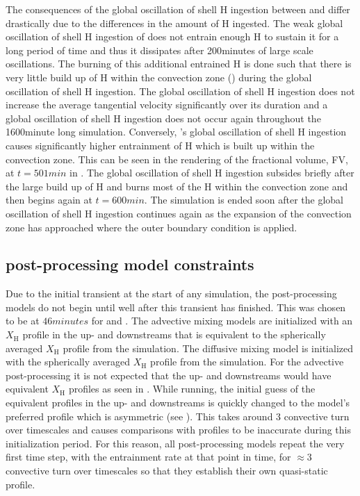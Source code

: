 \documentclass[fleqn,usenatbib]{mnras}
\newcommand{\ppmstar}{\code{PPMstar}}
\begin{document}
The consequences of the global oscillation of shell H ingestion between  and  differ
drastically due to the differences in the amount of H ingested. The weak global oscillation of shell H ingestion of
 does not entrain enough H to sustain it for a long period of time and
thus it dissipates after \unit{200}{minutes} of large scale oscillations. The
burning of this additional entrained H is done such that there is very little
build up of H within the convection zone () during the global oscillation of shell H ingestion. The
global oscillation of shell H ingestion does not increase the average tangential velocity significantly over its
duration and a global oscillation of shell H ingestion does not occur again throughout the \unit{1600}{minute} long
simulation. Conversely, 's global oscillation of shell H ingestion causes significantly higher
entrainment of H which is built up within the convection zone. This can be seen
in the rendering of the fractional volume, FV, at $t = \unit{501}{min}$ in
. The global oscillation of shell H ingestion subsides briefly after the large build up of H and
burns most of the H within the convection zone and then begins again at $t =
\unit{600}{min}$. The simulation is ended soon after the global oscillation of shell H ingestion continues again as
the expansion of the convection zone has approached where the outer boundary
condition is applied.

\subsection{\mppnp{} post-processing model constraints}
\label{sec:modelConstraints}

Due to the initial transient at the start of any \ppmstar{} simulation, the
\mppnp{} post-processing models do not begin until well after this transient has
finished. This was chosen to be at $\unit{46}{minutes}$ for
 and . The advective mixing models are initialized with an
$X_{\mathrm{H}}$ profile in the up- and downstreams that is equivalent to the
spherically averaged $X_{\mathrm{H}}$ profile from the \ppmstar{} simulation.
The diffusive mixing model is initialized with the spherically averaged
$X_{\mathrm{H}}$ profile from the \ppmstar{} simulation. For the advective
post-processing it is not expected that the up- and downstreams would have
equivalent $X_{\mathrm{H}}$ profiles as seen in . While running,
the initial guess of the equivalent profiles in the up- and downstreams is
quickly changed to the model's preferred profile which is asymmetric (see
). This takes around 3 convective turn over timescales
and causes comparisons with \ppmstar{} profiles to be inaccurate during this
initialization period. For this reason, all \mppnp{} post-processing models
repeat the very first time step, with the entrainment rate at that point in
time, for $\approx 3$ convective turn over timescales so that they establish
their own quasi-static profile.
\end{document}
